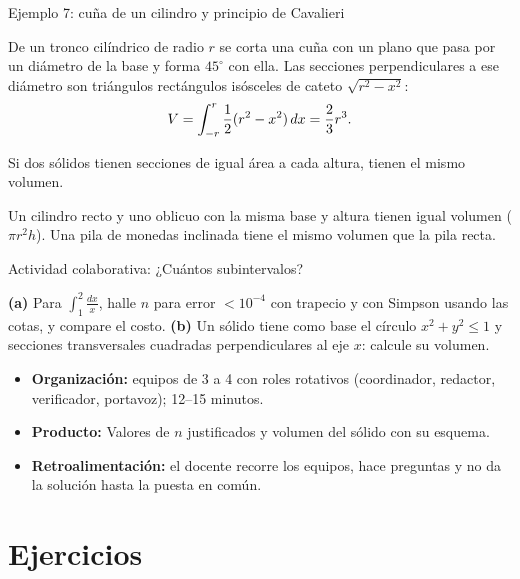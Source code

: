 \documentclass[10pt,aspectratio=169]{beamer}
\begin{document}
\begin{frame}{Ejemplo 7: cuña de un cilindro y principio de Cavalieri}
  \begin{ejemplo}[7]
    De un tronco cilíndrico de radio $r$ se corta una cuña con un plano que pasa por un diámetro de la base y forma
    $45^\circ$ con ella. Las secciones perpendiculares a ese diámetro son triángulos rectángulos isósceles de cateto
    $\sqrt{r^2-x^2}$:
    \[ V=\int_{-r}^r\frac12(r^2-x^2)\,dx=\frac23r^3. \]
  \end{ejemplo}
  \begin{teorema}
    Si dos sólidos tienen secciones de igual área a cada altura, tienen el mismo volumen.
  \end{teorema}
  \begin{ejemplo}[8]
    Un cilindro recto y uno oblicuo con la misma base y altura tienen igual volumen ($\pi r^2h$).
    Una pila de monedas inclinada tiene el mismo volumen que la pila recta.
  \end{ejemplo}
\end{frame}

\begin{frame}{Actividad colaborativa: ¿Cuántos subintervalos?}
  \small
  \begin{activa}[ABP]
    \textbf{(a)} Para $\int_1^2\frac{dx}{x}$, halle $n$ para error $<10^{-4}$ con trapecio y con Simpson usando las cotas, y compare el costo. \textbf{(b)} Un sólido tiene como base el círculo $x^2+y^2\le1$ y secciones transversales cuadradas perpendiculares al eje $x$: calcule su volumen.
  \end{activa}
  \begin{itemize}
    \item \textbf{Organización:} equipos de 3 a 4 con roles rotativos (coordinador, redactor, verificador, portavoz); 12--15 minutos.
    \item \textbf{Producto:} Valores de $n$ justificados y volumen del sólido con su esquema.
    \item \textbf{Retroalimentación:} el docente recorre los equipos, hace preguntas y no da la solución hasta la puesta en común.
  \end{itemize}
\end{frame}

\section{Ejercicios}
\end{document}
